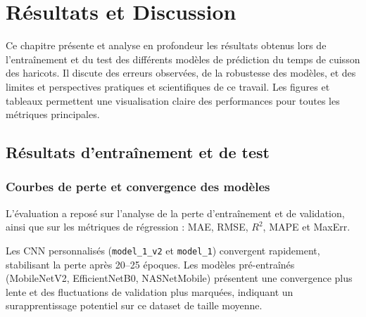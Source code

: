 \chapter{Résultats et Discussion}
\label{chap:resultats_discussion}

Ce chapitre présente et analyse en profondeur les résultats obtenus lors de l’entraînement et du test des différents modèles de prédiction du temps de cuisson des haricots. Il discute des erreurs observées, de la robustesse des modèles, et des limites et perspectives pratiques et scientifiques de ce travail. Les figures et tableaux permettent une visualisation claire des performances pour toutes les métriques principales.

\section{Résultats d’entraînement et de test}
\label{sec:resultats_train_test}

\subsection{Courbes de perte et convergence des modèles}
\label{subsec:loss_curves}

L’évaluation a reposé sur l’analyse de la perte d’entraînement et de validation, ainsi que sur les métriques de régression : MAE, RMSE, $R^2$, MAPE et MaxErr.  

Les CNN personnalisés (\texttt{model\_1\_v2} et \texttt{model\_1}) convergent rapidement, stabilisant la perte après 20–25 époques. Les modèles pré-entraînés (MobileNetV2, EfficientNetB0, NASNetMobile) présentent une convergence plus lente et des fluctuations de validation plus marquées, indiquant un surapprentissage potentiel sur ce dataset de taille moyenne.

